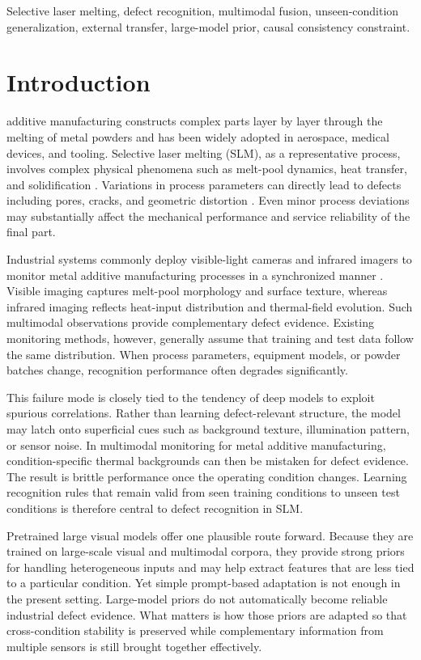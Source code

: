 \documentclass[journal]{IEEEtran}
\begin{document}
\begin{IEEEkeywords}
Selective laser melting, defect recognition, multimodal fusion, unseen-condition generalization, external transfer, large-model prior, causal consistency constraint.
\end{IEEEkeywords}

\section{Introduction}
 additive manufacturing constructs complex parts layer by layer through the melting of metal powders and has been widely adopted in aerospace, medical devices, and tooling. Selective laser melting (SLM), as a representative process, involves complex physical phenomena such as melt-pool dynamics, heat transfer, and solidification \cite{ref_defect_formation_slm}. Variations in process parameters can directly lead to defects including pores, cracks, and geometric distortion \cite{ref_in_situ_monitoring_review}. Even minor process deviations may substantially affect the mechanical performance and service reliability of the final part.

Industrial systems commonly deploy visible-light cameras and infrared imagers to monitor metal additive manufacturing processes in a synchronized manner \cite{ref_lpbf_sensing_review,ref_intelligent_defect_pbf}. Visible imaging captures melt-pool morphology and surface texture, whereas infrared imaging reflects heat-input distribution and thermal-field evolution. Such multimodal observations provide complementary defect evidence. Existing monitoring methods, however, generally assume that training and test data follow the same distribution. When process parameters, equipment models, or powder batches change, recognition performance often degrades significantly.

This failure mode is closely tied to the tendency of deep models to exploit spurious correlations. Rather than learning defect-relevant structure, the model may latch onto superficial cues such as background texture, illumination pattern, or sensor noise. In multimodal monitoring for metal additive manufacturing, condition-specific thermal backgrounds can then be mistaken for defect evidence. The result is brittle performance once the operating condition changes. Learning recognition rules that remain valid from seen training conditions to unseen test conditions is therefore central to defect recognition in SLM.

Pretrained large visual models offer one plausible route forward. Because they are trained on large-scale visual and multimodal corpora, they provide strong priors for handling heterogeneous inputs and may help extract features that are less tied to a particular condition. Yet simple prompt-based adaptation is not enough in the present setting. Large-model priors do not automatically become reliable industrial defect evidence. What matters is how those priors are adapted so that cross-condition stability is preserved while complementary information from multiple sensors is still brought together effectively.
\end{document}
